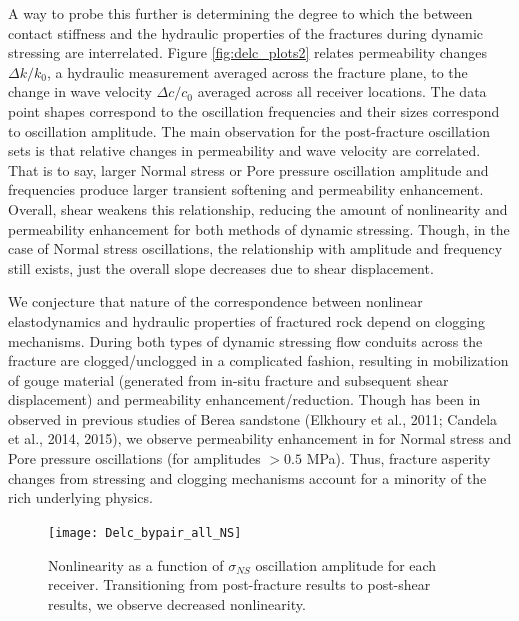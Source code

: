 A way to probe this further is determining the degree to which the between contact stiffness and the hydraulic properties of the fractures during dynamic stressing are interrelated. Figure \ref{fig:delc_plots2} relates permeability changes $ \Delta k/k_0 $, a hydraulic measurement averaged across the fracture plane, to the change in wave velocity $ \Delta c/c_0 $ averaged across all receiver locations. The data point shapes correspond to the oscillation frequencies and their sizes correspond to oscillation amplitude. The main observation for the post-fracture oscillation sets is that relative changes in permeability and wave velocity are correlated. That is to say, larger Normal stress or Pore pressure oscillation amplitude and frequencies produce larger transient softening and permeability enhancement. Overall, shear weakens this relationship, reducing the amount of nonlinearity and permeability enhancement for both methods of dynamic stressing. Though, in the case of Normal stress oscillations, the relationship with amplitude and frequency still exists, just the overall slope decreases due to shear displacement. 

We conjecture that nature of the correspondence between nonlinear elastodynamics and hydraulic properties of fractured rock depend on clogging mechanisms. During both types of dynamic stressing flow conduits across the fracture are clogged/unclogged in a complicated fashion, resulting in mobilization of gouge material (generated from in-situ fracture and subsequent shear displacement) and permeability enhancement/reduction. Though has been in observed in previous studies of Berea sandstone (Elkhoury et al., 2011; Candela et al., 2014, 2015), we observe permeability enhancement in for Normal stress and Pore pressure oscillations (for amplitudes $ > 0.5 $  MPa). Thus, fracture asperity changes from stressing and clogging mechanisms account for a minority of the rich underlying physics.     



\begin{figure}[ht]
	\centering
	\texttt{[image: Delc\_bypair\_all\_NS]}
	\caption{Nonlinearity as a function of $ \sigma_{NS} $ oscillation amplitude for each receiver. Transitioning from post-fracture results to post-shear results, we observe decreased nonlinearity.}
		\label{fig:delc_plots_ns}
\end{figure}

